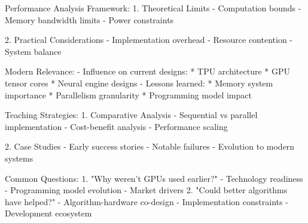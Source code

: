 \documentclass[aspectratio=169,t,xcolor=table]{beamer}
\begin{document}
\begin{frame}
{    Performance Analysis Framework:
    1. Theoretical Limits
        - Computation bounds
        - Memory bandwidth limits
        - Power constraints
    
    2. Practical Considerations
        - Implementation overhead
        - Resource contention
        - System balance
    
    Modern Relevance:
    - Influence on current designs:
        * TPU architecture
        * GPU tensor cores
        * Neural engine designs
    - Lessons learned:
        * Memory system importance
        * Parallelism granularity
        * Programming model impact
    
    Teaching Strategies:
    1. Comparative Analysis
        - Sequential vs parallel implementation
        - Cost-benefit analysis
        - Performance scaling
    
    2. Case Studies
        - Early success stories
        - Notable failures
        - Evolution to modern systems
    
    Common Questions:
    1. "Why weren't GPUs used earlier?"
        - Technology readiness
        - Programming model evolution
        - Market drivers
    2. "Could better algorithms have helped?"
        - Algorithm-hardware co-design
        - Implementation constraints
        - Development ecosystem
}
\end{frame}
\end{document}
